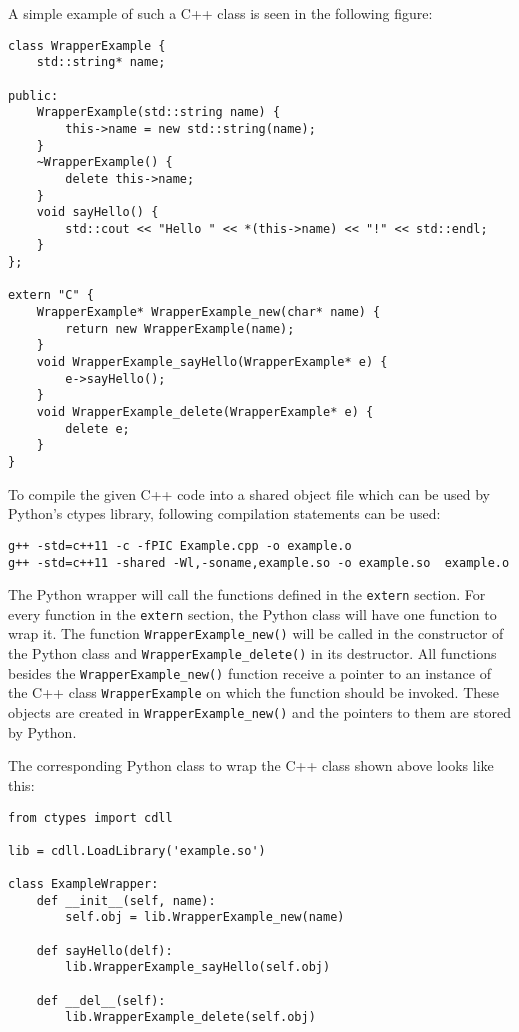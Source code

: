 \documentclass{acm_proc_article-sp}
\begin{document}
A simple example of such a C++ class is seen in the following figure:

\begin{lstlisting}[caption=Example C++ class for wrapping a C++ object in a Python object (Example.cpp)]
class WrapperExample {
    std::string* name;
    
public:
    WrapperExample(std::string name) {
        this->name = new std::string(name);
    }
    ~WrapperExample() {
        delete this->name;
    }
    void sayHello() {
        std::cout << "Hello " << *(this->name) << "!" << std::endl;
    }
};

extern "C" {
    WrapperExample* WrapperExample_new(char* name) {
        return new WrapperExample(name);
    }
    void WrapperExample_sayHello(WrapperExample* e) {
        e->sayHello();
    }
    void WrapperExample_delete(WrapperExample* e) {
        delete e;
    }
}
\end{lstlisting}

To compile the given C++ code into a shared object file which can be used by Python's ctypes library, following compilation statements can be used:

\lstset{language= bash}
\begin{lstlisting}[caption=Compilation of the C++ class into a shared object file]
g++ -std=c++11 -c -fPIC Example.cpp -o example.o
g++ -std=c++11 -shared -Wl,-soname,example.so -o example.so  example.o
\end{lstlisting}

The Python wrapper will call the functions defined in the \texttt{extern} section. For every function in the \texttt{extern} section, the Python class will have one function to wrap it. The function \texttt{WrapperExample\_new()} will be called in the constructor of the Python class and \texttt{WrapperExample\_delete()} in its  destructor. All functions besides the \texttt{WrapperExample\_new()} function receive a pointer to an instance of the C++ class \texttt{WrapperExample} on which the function should be invoked. These objects are created in \texttt{WrapperExample\_new()} and the pointers to them are stored by Python.

The corresponding Python class to wrap the C++ class shown above looks like this:

\lstset{language=Python}
\begin{lstlisting}[caption=Python class wrapping the C++ class shown above (Example.py)]
from ctypes import cdll

lib = cdll.LoadLibrary('example.so')

class ExampleWrapper:
    def __init__(self, name):
        self.obj = lib.WrapperExample_new(name)
        
    def sayHello(delf):
        lib.WrapperExample_sayHello(self.obj)
        
    def __del__(self): 
        lib.WrapperExample_delete(self.obj)
\end{lstlisting}
\end{document}
